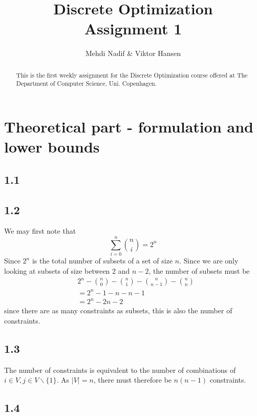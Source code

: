 \documentclass[12pt]{article}
\begin{document}
\nocite{*}


\title{Discrete Optimization \\
       Assignment 1}

\author{Mehdi Nadif \& Viktor Hansen}

\maketitle

\begin{abstract}
  This is the first weekly assignment for the Discrete Optimization course offered at The Department of Computer Science, Uni. Copenhagen.
\end{abstract}

\pagebreak

\section*{Theoretical part - formulation and lower bounds}
\subsection*{1.1}
\subsection*{1.2}

We may first note that 
$$
\sum_{i=0}^n\binom{n}{i} = 2^n
$$
Since $2^n$ is the total number of subsets of a set of size $n$. Since we are only looking at subsets of size between 2 and $n-2$, the number of subsets must be 
\begin{align*}
&2^n - \binom{n}{0} - \binom{n}{1} - \binom{n}{n-1} - \binom{n}{n} \\
&=2^n - 1 - n - n - 1 \\&= 2^n - 2n - 2 
\end{align*}
since there are as many constraints as subsets, this is also the number of constraints.
\subsection*{1.3}
The number of constraints is equivalent to the number of combinations of $i \in V, j \in V \backslash\{1\}$. As $|V| = n$, there must therefore be $n(n-1)$ constraints.
\subsection*{1.4}
\end{document}
